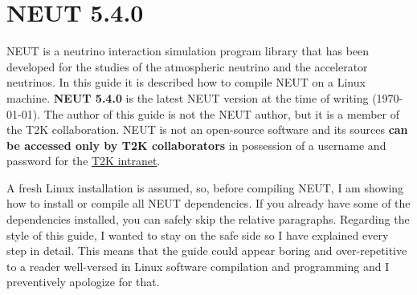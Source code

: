 \tableofcontents\label{c}
\newpage


\chapter{NEUT 5.4.0}
NEUT is a neutrino interaction simulation program library that has
been developed for the studies of the atmospheric neutrino and the
accelerator neutrinos. In this guide it is described how to compile
NEUT on a Linux machine. \textbf{NEUT 5.4.0} is the latest NEUT
version at the time of writing (\today). The author of this guide is
not the NEUT author, but it is a member of the T2K collaboration. NEUT
is not an open-source software and its sources \textbf{can be accessed
  only by T2K collaborators} in possession of a username and password
for the \href{https://www.t2k.org/}{T2K intranet}.

A fresh Linux installation is assumed, so, before compiling NEUT, I am
showing how to install or compile all NEUT dependencies. If you
already have some of the dependencies installed, you can safely skip
the relative paragraphs. Regarding the style of this guide, I wanted
to stay on the safe side so I have explained every step in
detail. This means that the guide could appear boring and
over-repetitive to a reader well-versed in Linux software compilation
and programming and I preventively apologize for that.

